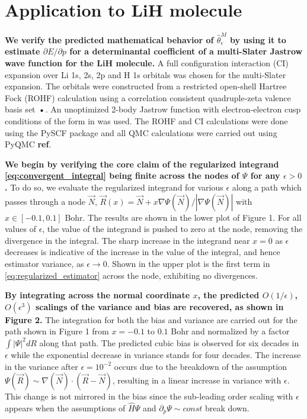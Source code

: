 \documentclass{article}
\begin{document}
\section{Application to LiH molecule}
\textbf{We verify the predicted mathematical behavior of $\hat{\theta}_\epsilon^M$ by using it to estimate $\partial E/\partial p$ for a determinantal coefficient of a multi-Slater Jastrow wave function for the LiH molecule.}
A full configuration interaction (CI) expansion over Li 1s, 2s, 2p and H 1s orbitals was chosen for the multi-Slater expansion.
The orbitals were constructed from a restricted open-shell Hartree Fock (ROHF) calculation using a correlation consistent quadruple-zeta valence basis set \cite{doi:10.1063/1.456153}\textbf{•}.
An unoptimized 2-body Jastrow function with electron-electron cusp conditions of the form in \cite{Wagner2009} was used.
The ROHF and CI calculations were done using the PySCF package \cite{PYSCF} and all QMC calculations were carried out using PyQMC \textbf{ref}.

\textbf{We begin by verifying the core claim of the regularized integrand \eqref{eq:convergent_integral} being finite across the nodes of $\Psi$ for any $\epsilon > 0$.}
To do so, we evaluate the regularized integrand for various $\epsilon$ along a path which passes through a node $\vec{N}$, $\vec{R}(x) = \vec{N} + x \nabla \Psi(\vec{N})/|\nabla \Psi(\vec{N})|$ with $x \in [-0.1, 0.1]$ Bohr.
The results are shown in the lower plot of Figure 1.
For all values of $\epsilon$, the value of the integrand is pushed to zero at the node, removing the divergence in the integral.
The sharp increase in the integrand near $x=0$ as $\epsilon$ decreases is indicative of the increase in the value of the integral, and hence estimator variance, as $\epsilon \rightarrow 0$.
Shown in the upper plot is the first term in \eqref{eq:regularized_estimator} across the node, exhibiting no divergences.

\textbf{By integrating across the normal coordinate $x$, the predicted $O(1/\epsilon)$, $O(\epsilon^3)$ scalings of the variance and bias are recovered, as shown in Figure 2.} 
The integration for both the bias and variance are carried out for the path shown in Figure 1 from $x = -0.1$ to $0.1$ Bohr and normalized by a factor $\int |\Psi|^2 dR$ along that path.
The predicted cubic bias is observed for six decades in $\epsilon$ while the exponential decrease in variance stands for four decades.
The increase in the variance after $\epsilon = 10^{-2}$ occurs due to the breakdown of the assumption $\Psi(\vec{R}) \sim \nabla(\vec{N}) \cdot (\vec{R}-\vec{N})$, resulting in a linear increase in variance with $\epsilon$.
This change is not mirrored in the bias since the sub-leading order scaling with $\epsilon$ appears when the assumptions of $\hat{H}\Psi$ and $\partial_p \Psi \sim const$ break down.
\end{document}
